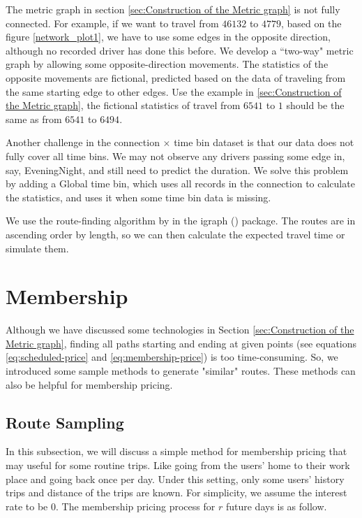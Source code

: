 \documentclass[12pt]{article}
\begin{document}
{{{{{{\begin{appendices}
The metric graph in section \ref{sec:Construction of the Metric graph} is not fully connected. For example, if we want to travel from $46132$ to $4779$, based on the figure \ref{network_plot1}, we have to use some edges in the opposite direction, although no recorded driver has done this before. We develop a ``two-way" metric graph by allowing some opposite-direction movements. The statistics of the opposite movements are fictional, predicted based on the data of traveling from the same starting edge to other edges. Use the example in \ref{sec:Construction of the Metric graph}, the fictional statistics of travel from $6541$ to $1$ should be the same as from $6541$ to $6494$. 

Another challenge in the connection $\times$ time bin dataset is that our data does not fully cover all time bins. We may not observe any drivers passing some edge in, say, EveningNight, and still need to predict the duration. We solve this problem by adding a Global time bin, which uses all records in the connection to calculate the statistics, and uses it when some time bin data is missing.

We use the route-finding algorithm by \cite{1970algorithm} in the igraph (\cite{igraph}) package. The routes are in ascending order by length, so we can then calculate the expected travel time or simulate them.

\section{Membership}\label{sec:membership}
Although we have discussed some technologies in Section \ref{sec:Construction of the Metric graph}, finding all paths starting and ending at given points (see equations \ref{eq:scheduled-price} and \ref{eq:membership-price}) is too time-consuming. So, we introduced some sample methods to generate "similar" routes. These methods can also be helpful for membership pricing.
\subsection{Route Sampling}\label{sec:case-study}
In this subsection, we will discuss a simple method for membership pricing that may useful for some routine trips. Like going from the users' home to their work place and going back once per day. Under this setting, only some users' history trips and distance of the trips are known. For simplicity, we assume the interest rate to be $0.$ The membership pricing process for $r$ future days is as follow.


\end{appendices}}}}}}}
\end{document}
